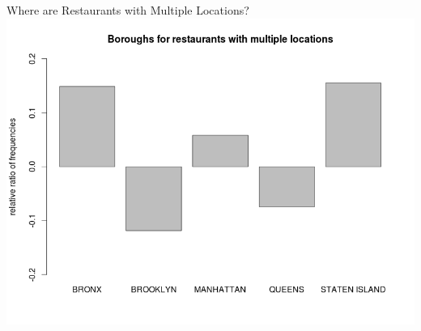 \documentclass[12pt]{beamer}
\begin{document}
\begin{frame}{Where are Restaurants with Multiple Locations?}
\includegraphics[width=\textwidth]{plots/boro_multiple}
\end{frame}
\end{document}
